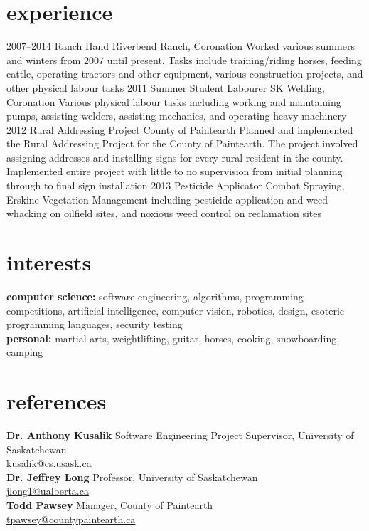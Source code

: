 \documentclass[print]{friggeri-cv} %
\begin{document}
\section{experience}
\begin{entrylist}
\entry
{2007--2014}
{Ranch Hand}
{Riverbend Ranch, Coronation}
{Worked various summers and winters from 2007 until present. Tasks
include training/riding horses, feeding cattle, operating tractors
and other equipment, various construction projects, and other 
physical labour tasks}
\entry
{\hspace{2.7em}2011}
{Summer Student Labourer}
{SK Welding, Coronation}
{Various physical labour tasks including working and maintaining 
pumps, assisting welders, assisting mechanics, and operating heavy 
machinery}
\entry
{\hspace{2.7em}2012}
{Rural Addressing Project}
{County of Paintearth}
{Planned and implemented the Rural Addressing Project for the 
County of Paintearth. The project involved assigning addresses and
installing signs for every rural resident in the county.
Implemented entire project with little to no supervision 
from initial planning through to final sign installation}
\entry
{\hspace{2.7em}2013}
{Pesticide Applicator}
{Combat Spraying, Erskine}
{Vegetation Management including pesticide application and weed whacking on oilfield sites, and noxious weed control on reclamation 
sites}
\end{entrylist}

\section{interests}
\textbf{computer science:} software engineering, algorithms,
programming competitions, artificial intelligence, computer vision,
robotics, design, esoteric programming languages, security testing
\\\textbf{personal:} martial arts, weightlifting, guitar, horses,
cooking, snowboarding, camping

\section{references}
\textbf{Dr. Anthony Kusalik} Software Engineering Project 
Supervisor, University of Saskatchewan \\
\href{mailto:kusalik@cs.usask.ca}{kusalik@cs.usask.ca}
\\
\textbf{Dr. Jeffrey Long} Professor, University of Saskatchewan \\
\href{mailto:jlong1@ualberta.ca}{jlong1@ualberta.ca}
\\
\textbf{Todd Pawsey} Manager, County of Paintearth \\
\href{TPawsey@countypaintearth.ca}{tpawsey@countypaintearth.ca}
\end{document}
